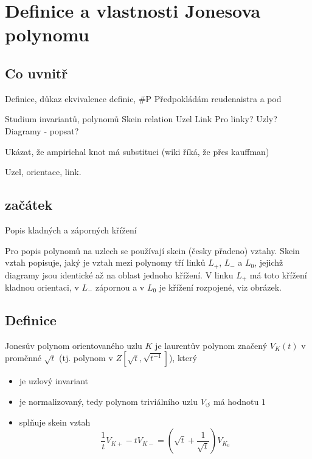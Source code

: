 
\chapter{Definice a vlastnosti Jonesova polynomu}

\section{Co uvnitř}



Definice, důkaz ekvivalence definic, \#P 
Předpokládám reudenaistra a pod

Studium invariantů, polynomů
Skein relation
Uzel
Link
Pro linky? Uzly?
Diagramy - popsat?

Ukázat, že ampirichal knot má substituci (wiki říká, že přes kauffman)

Uzel, orientace, link.

\section{začátek}
Popis kladných a záporných křížení

Pro popis polynomů na uzlech se používají skein (česky přadeno) vztahy.
Skein vztah popisuje, jaký je vztah mezi polynomy tří linků $L_+$, $ L_-$ a $L_0$, jejichž diagramy jsou identické až na oblast jednoho křížení. V linku $L_+$ má toto křížení kladnou orientaci, v $L_-$ zápornou a v $L_0$ je křížení rozpojené, viz obrázek.

\section{Definice}

\begin{definice}\label{def01:1}
Jonesův polynom orientovaného uzlu $K$ je laurentův polynom značený $V_K(t)$ v proměnné $\sqrt t$ (tj. polynom v $Z[\sqrt t, \sqrt{t^{-1}}]$), který
\begin{itemize}
\item
je uzlový invariant
\item 
  je normalizovaný, tedy polynom triviálního uzlu $V_\circlearrowleft$ má hodnotu $1$ 
\item  
splňuje skein vztah 
$$ \frac{1}{t} V_{K+} - t V_{K-} = (\sqrt{t}  + \frac{1}{\sqrt{t}}) V_{K_0}$$
\end{itemize}
\end{definice}

